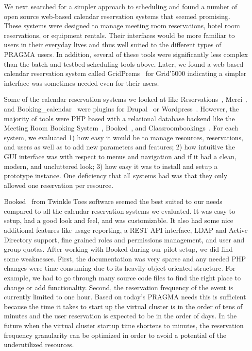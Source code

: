 \documentclass[times]{cpeauth}
\begin{document}
We next searched for a simpler approach to scheduling and found a number of open source web-based calendar reservation systems that seemed promising.  These systems were designed to manage meeting room reservations, hotel room reservations, or equipment rentals.   Their interfaces would be more familiar to users in their everyday lives and thus well suited to the different types of PRAGMA users.  In addition, several of these tools were significantly less complex than the batch and testbed scheduling tools above.  Later, we found a web-based calendar reservation system called GridPrems~\cite{gridprems} for Grid'5000 indicating a simpler interface was sometimes needed even for their users.

Some of the calendar reservation systems we looked at like Reservations~\cite{drupalreservations}, Merci~\cite{merci}, and Booking\_calendar~\cite{wordpressbooking} were plugins for Drupal~\cite{drupal} or Wordpress~\cite{wordpress}.  However, the majority of tools were PHP based with a relational database backend like the Meeting Room Booking System~\cite{mrbs}, Booked~\cite{booked}, and Classroombookings~\cite{classroombookings}.  For each system, we evaluated 1) how easy it would be to manage resources, reservations, and users as well as to add new parameters and features; 2) how intuitive the GUI interface was with respect to menus and navigation and if it had a clean, modern, and uncluttered look; 3)  how easy it was to install and setup a prototype instance. One deficiency that all systems had was that they only allowed one reservation per resource.

Booked~\cite{booked} from Twinkle Toes software seemed the best suited to our needs compared to all the calendar reservation systems we evaluated.  It was easy to setup, had  a good look and feel, and was customizable.  It also had some nice additional features like usage reporting, a REST API interface, LDAP and Active Directory support, fine grained roles and permissions management, and user and group quotas.  After working with Booked during our pilot setup, we did find some weaknesses.  First, the documentation was very sparse and any needed PHP changes were time consuming due to its heavily object-oriented structure.  For example, we had to go through many source code files to find the right place to change  or add functionality.   Second, the reservation frequency of the event is currently limited to one hour.  Based on today's PRAGMA needs this is sufficient because the time it takes to start up the virtual cluster 
is in the order of tens of minutes and  the user reservation is expected to be in the order of days. In the future when the virtual cluster startup  time shortens to minutes, the reservation frequency granularity can be optimized in order to avoid a potential of the underutilized resources.
\end{document}
